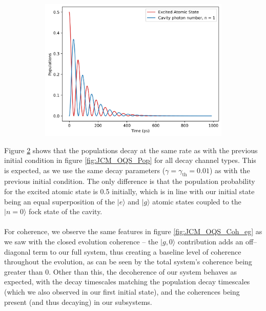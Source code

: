 \documentclass[11pt]{article}
\begin{document}
\begin{figure}[H]
    \vspace{0.5cm}
    
    \begin{subfigure}{0.45\textwidth}
        \centering
        \includegraphics[width=\linewidth]{Research Project/Code/results/JCM/OQS_Pop_Both_eg.png}
        \caption{}
        \label{fig:JCM_OQS_Pop_Both_eg}
    \end{subfigure}
    \hfill

    \caption{}
    \label{fig:JCM_OQS_Pop_eg}
\end{figure}

Figure \ref{fig:JCM_OQS_Pop_eg} shows that the populations decay at the same rate as with the previous initial condition in figure \ref{fig:JCM_OQS_Pop} for all decay channel types. This is expected, as we use the same decay parameters ($\gamma= \gamma_{\scriptscriptstyle \text{th}} = 0.01$) as with the previous initial condition. The only difference is that the population probability for the excited atomic state is 0.5 initially, which is in line with our initial state being an equal superposition of the $|e\rangle$ and $|g\rangle$ atomic states coupled to the $|n=0\rangle$ fock state of the cavity. \\
\\
For coherence, we observe the same features in figure \ref{fig:JCM_OQS_Coh_eg} as we saw with the closed evolution coherence  -- the $|g,0\rangle$ contribution adds an off--diagonal term to our full system, thus creating a baseline level of coherence throughout the evolution, as can be seen by the total system's coherence being greater than 0. Other than this, the decoherence of our system behaves as expected, with the decay timescales matching the population decay timescales (which we also observed in our first initial state), and the coherences being present (and thus decaying) in our subsystems. 
\end{document}

